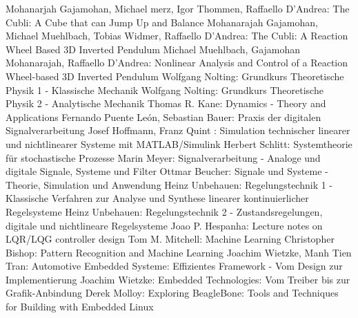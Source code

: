 \documentclass{article}
\begin{document}
\newpage
\begin{thebibliography}{\hspace{0.5cm}}
	 Mohanarjah Gajamohan, Michael merz, Igor Thommen, Raffaello D'Andrea: The Cubli: A Cube that can Jump Up and Balance
	 Mohanarajah Gajamohan, Michael Muehlbach, Tobias Widmer, Raffaello D'Andrea: The Cubli: A Reaction Wheel Based 3D Inverted Pendulum
	 Michael Muehlbach, Gajamohan Mohanarajah, Raffaello D'Andrea: Nonlinear Analysis and Control of a Reaction Wheel-based 3D Inverted Pendulum
	 Wolfgang Nolting: Grundkurs Theoretische Physik 1 - Klassische Mechanik
	 Wolfgang Nolting: Grundkurs Theoretische Physik 2 - Analytische Mechanik
	 Thomas R. Kane: Dynamics - Theory and Applications
	 Fernando Puente Le\'on, Sebastian Bauer: Praxis der digitalen Signalverarbeitung
	 Josef Hoffmann, Franz Quint : Simulation technischer linearer und nichtlinearer Systeme mit MATLAB/Simulink
	 Herbert Schlitt: Systemtheorie für stochastische Prozesse
	 Marin Meyer: Signalverarbeitung - Analoge und digitale Signale, Systeme und Filter
	 Ottmar Beucher: Signale und Systeme - Theorie, Simulation und Anwendung
	 Heinz Unbehauen: Regelungstechnik 1 - Klassische Verfahren zur Analyse und Synthese linearer kontinuierlicher Regelsysteme
	 Heinz Unbehauen: Regelungstechnik 2 - Zustandsregelungen, digitale und nichtlineare Regelsysteme
	 Joao P. Hespanha: Lecture notes on LQR/LQG controller design
	 Tom M. Mitchell: Machine Learning
	 Christopher Bishop: Pattern Recognition and Machine Learning
	 Joachim Wietzke, Manh Tien Tran: Automotive Embedded Systeme: Effizientes Framework - Vom Design zur Implementierung
	 Joachim Wietzke: Embedded Technologies: Vom Treiber bis zur Grafik-Anbindung
	 Derek Molloy: Exploring BeagleBone: Tools and Techniques for Building with Embedded Linux
\end{thebibliography}


\end{document}
